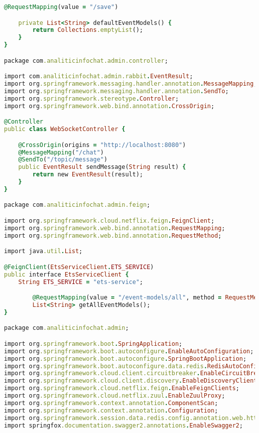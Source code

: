 \begin{lstlisting}[language=Ruby, style=rubystyle]
    @RequestMapping(value = "/save")

    private List<String> defaultEventModels() {
        return Collections.emptyList();
    }
}

package com.analiticinfochat.admin.controller;

import com.analiticinfochat.admin.rabbit.EventResult;
import org.springframework.messaging.handler.annotation.MessageMapping;
import org.springframework.messaging.handler.annotation.SendTo;
import org.springframework.stereotype.Controller;
import org.springframework.web.bind.annotation.CrossOrigin;

@Controller
public class WebSocketController {

    @CrossOrigin(origins = "http://localhost:8080")
    @MessageMapping("/chat")
    @SendTo("/topic/message")
    public EventResult sendMessage(String result) {
        return new EventResult(result);
    }
}

package com.analiticinfochat.admin.feign;

import org.springframework.cloud.netflix.feign.FeignClient;
import org.springframework.web.bind.annotation.RequestMapping;
import org.springframework.web.bind.annotation.RequestMethod;

import java.util.List;

@FeignClient(EtsServiceClient.ETS_SERVICE)
public interface EtsServiceClient {
    String ETS_SERVICE = "ets-service";

        @RequestMapping(value = "/event-models/all", method = RequestMethod.GET)
        List<String> getAllEventModels();
}

package com.analiticinfochat.admin;

import org.springframework.boot.SpringApplication;
import org.springframework.boot.autoconfigure.EnableAutoConfiguration;
import org.springframework.boot.autoconfigure.SpringBootApplication;
import org.springframework.boot.autoconfigure.data.redis.RedisAutoConfiguration;
import org.springframework.cloud.client.circuitbreaker.EnableCircuitBreaker;
import org.springframework.cloud.client.discovery.EnableDiscoveryClient;
import org.springframework.cloud.netflix.feign.EnableFeignClients;
import org.springframework.cloud.netflix.zuul.EnableZuulProxy;
import org.springframework.context.annotation.ComponentScan;
import org.springframework.context.annotation.Configuration;
import org.springframework.session.data.redis.config.annotation.web.http.EnableRedisHttpSession;
import springfox.documentation.swagger2.annotations.EnableSwagger2;


\end{lstlisting}
